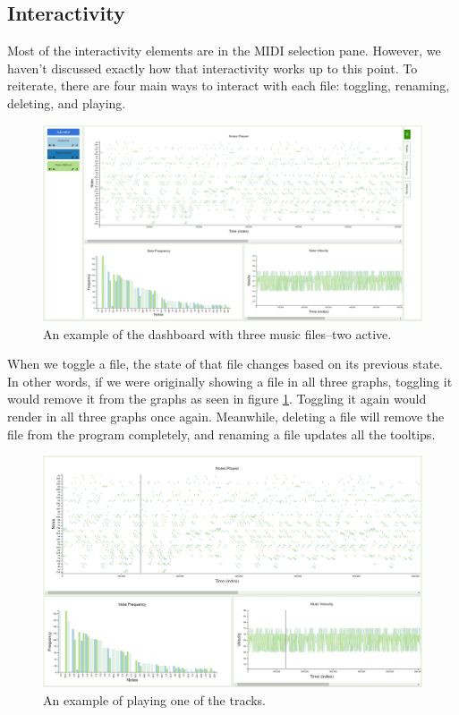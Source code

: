 \documentclass[journal]{vgtc}                %
\begin{document}
\subsection{Interactivity}

Most of the interactivity elements are in the MIDI selection pane. However, we
haven't discussed exactly how that interactivity works up to this point. To
reiterate, there are four main ways to interact with each file: toggling,
renaming, deleting, and playing.

\begin{figure}[h]
  \centering
  \includegraphics[width=\columnwidth]{dashboard-multi-track}
  \caption{An example of the dashboard with three music files--two active.}
  \label{fig:dashboard-multi}
\end{figure}

When we toggle a file, the state of that file changes based on its previous
state. In other words, if we were originally showing a file in all three graphs,
toggling it would remove it from the graphs as seen in figure
\ref{fig:dashboard-multi}. Toggling it again would render in all three graphs
once again. Meanwhile, deleting a file will remove the file from the program
completely, and renaming a file updates all the tooltips.

\begin{figure}[h]
  \centering
  \includegraphics[width=\columnwidth]{play-multi-track}
  \caption{An example of playing one of the tracks.}
  \label{fig:play}
\end{figure}
\end{document}
